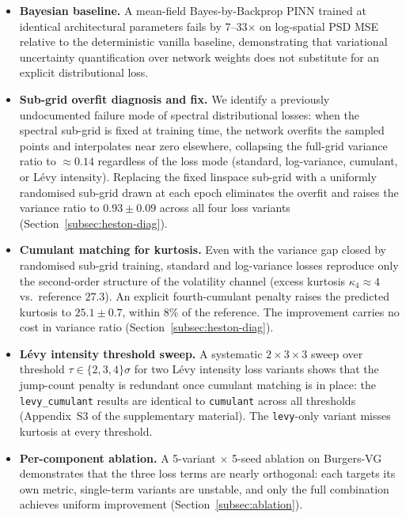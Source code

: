 \documentclass[review,12pt]{elsarticle}
\begin{document}
\begin{itemize}
\item \textbf{Bayesian baseline.} A mean-field Bayes-by-Backprop PINN
trained at identical architectural parameters fails by 7--33\(\times\)
on log-spatial PSD MSE relative to the deterministic vanilla baseline,
demonstrating that variational uncertainty quantification over network
weights does not substitute for an explicit distributional loss.

\item \textbf{Sub-grid overfit diagnosis and fix.} We identify a
previously undocumented failure mode of spectral distributional
losses: when the spectral sub-grid is fixed at training time, the
network overfits the sampled points and interpolates near zero
elsewhere, collapsing the full-grid variance ratio to \(\approx 0.14\)
regardless of the loss mode (standard, log-variance, cumulant, or
L\'evy intensity). Replacing the fixed linspace sub-grid with a
uniformly randomised sub-grid drawn at each epoch eliminates the
overfit and raises the variance ratio to \(0.93 \pm 0.09\) across all
four loss variants (Section~\ref{subsec:heston-diag}).

\item \textbf{Cumulant matching for kurtosis.} Even with the variance
gap closed by randomised sub-grid training, standard and log-variance
losses reproduce only the second-order structure of the volatility
channel (excess kurtosis \(\kappa_4 \approx 4\) vs.\ reference
\(27.3\)). An explicit fourth-cumulant penalty raises the predicted
kurtosis to \(25.1 \pm 0.7\), within 8\% of the reference. The
improvement carries no cost in variance ratio
(Section~\ref{subsec:heston-diag}).

\item \textbf{L\'evy intensity threshold sweep.} A systematic
\(2\times3\times3\) sweep over threshold \(\tau \in \{2, 3, 4\}\sigma\)
for two L\'evy intensity loss variants shows that the jump-count
penalty is redundant once cumulant matching is in place: the
\texttt{levy\_cumulant} results are identical to \texttt{cumulant}
across all thresholds (Appendix~S3 of the supplementary material). The
\texttt{levy}-only variant misses kurtosis at every threshold.

\item \textbf{Per-component ablation.} A 5-variant \(\times\) 5-seed
ablation on Burgers-VG demonstrates that the three loss terms are
nearly orthogonal: each targets its own metric, single-term
variants are unstable, and only the full combination achieves
uniform improvement (Section~\ref{subsec:ablation}).


\end{itemize}
\end{document}
